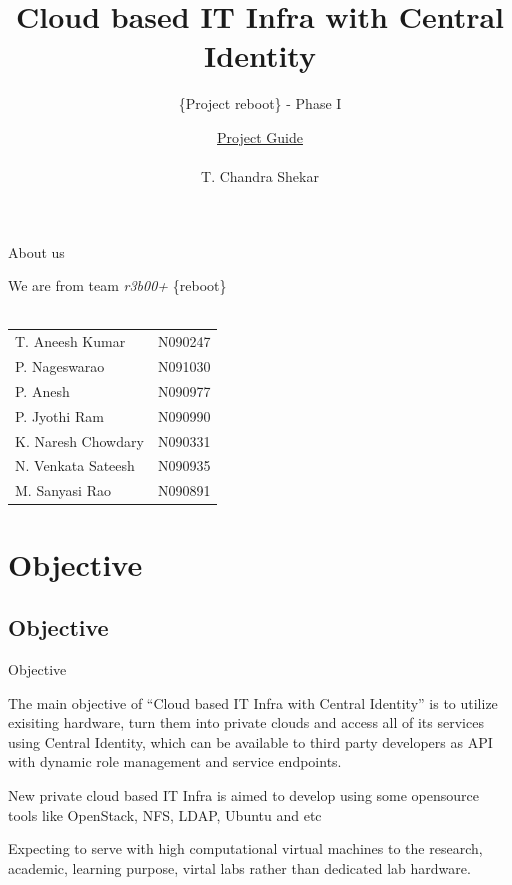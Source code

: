 \documentclass[xcolor=dvipsnames]{beamer}
\title[Cloud based IT Infra with Central Identity]{Cloud based IT Infra with Central Identity}
\subtitle{\{Project reboot\} - Phase I  }
\author{ \underline{Project Guide} \\ \hspace{2mm} \\ \small{ T. Chandra Shekar }  }
\institute{ \underline{Presenting by} \\ \hspace{2mm} \\ \textit {Team r3b00+ }  \\ \hspace{4mm} \\ \textit{Dept. of CSE, RGUKT - Nuzvid}}
\begin{document}
\begin{frame}
\titlepage
\end{frame}

\begin{frame}{About us}

\small
\begin{center}
We are from team \textit{r3b00+}  \{reboot\} \\ \hspace{4cm} \\
\begin{tabular}{l  l }
T. Aneesh Kumar & N090247   \\
P. Nageswarao  & N091030  \\
P. Anesh  & N090977 \\
P. Jyothi Ram & N090990 \\
K. Naresh Chowdary  & N090331 \\
N. Venkata Sateesh  & N090935 \\
M. Sanyasi Rao & N090891  
\end{tabular}


\end{center}


\end{frame}
 
\setcounter{page}{1}
\section{Objective}
\subsection{Objective}
\begin{frame}{Objective}

The main objective of ``Cloud based IT Infra with Central Identity'' is to utilize exisiting hardware, turn them into private clouds and access all of its services using 
Central Identity, which can be available to third party developers as API with dynamic role management and service endpoints. \newline

New private cloud based IT Infra is aimed to develop using some opensource tools like OpenStack, NFS, LDAP, Ubuntu and etc \newline

Expecting to serve with high computational virtual machines to the research, academic, learning purpose, virtal labs rather than dedicated lab hardware.
\end{frame}
\end{document}
